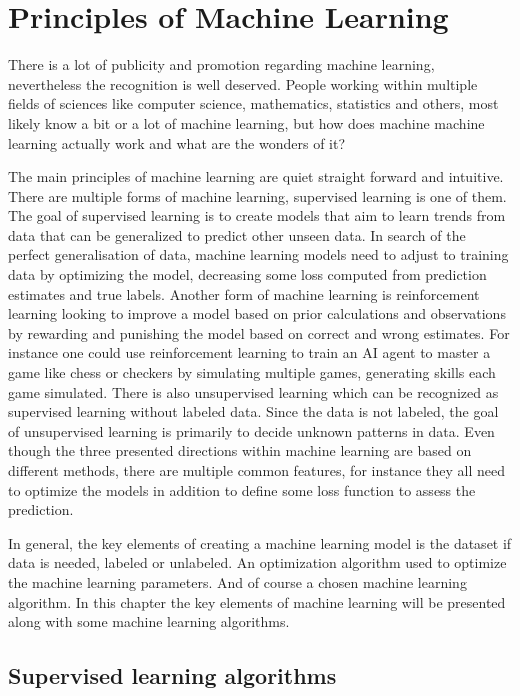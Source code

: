 \documentclass[../main.tex]{subfiles}
\begin{document}
\chapter{Principles of Machine Learning}
\label{sec:second}
There is a lot of publicity and promotion regarding machine learning, nevertheless the recognition is well deserved. People working within multiple fields of sciences like computer science, mathematics, statistics and others, most likely know a bit or a lot of machine learning, but how does machine machine learning actually work and what are the wonders of it? 

The main principles of machine learning are quiet straight forward and intuitive. There are multiple forms of machine learning, supervised learning is one of them. The goal of supervised learning is to create models that aim to learn trends from data that can be generalized to predict other unseen data. In search of the perfect generalisation of data, machine learning models need to adjust to training data by optimizing the model, decreasing some loss computed from prediction estimates and true labels. Another form of machine learning is reinforcement learning looking to improve a model based on prior calculations and observations by rewarding and punishing the model based on correct and wrong estimates. For instance one could use reinforcement learning to train an AI agent to master a game like chess or checkers by simulating multiple games, generating skills each game simulated. There is also unsupervised learning which can be recognized as supervised learning without labeled data. Since the data is not labeled, the goal of unsupervised learning is primarily to decide unknown patterns in data. Even though the three presented directions within machine learning are based on different methods, there are multiple common features, for instance they all need to optimize the models in addition to define some loss function to assess the prediction.

In general, the key elements of creating a machine learning model is the dataset if data is needed, labeled or unlabeled. An optimization algorithm used to optimize the machine learning parameters. And of course a chosen machine learning algorithm. In this chapter the key elements of machine learning will be presented along with some machine learning algorithms.

\section{Supervised learning algorithms}
\label{sec:supervised_learning}
\end{document}
